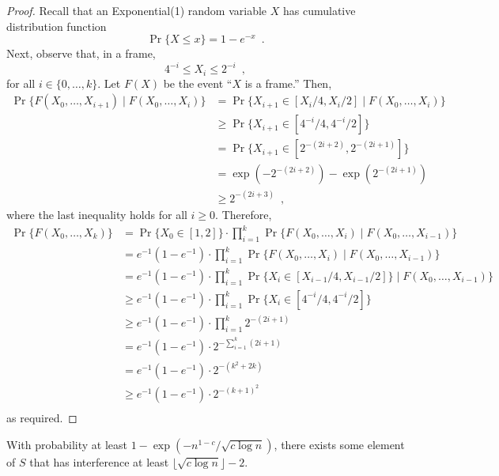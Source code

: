 \documentclass{patmorin}
\begin{document}
\begin{proof}
Recall that an Exponential(1) random variable $X$ has cumulative
distribution function
\[
   \Pr\{X \le x\} = 1-e^{-x} \enspace .
\]
Next, observe that, in a frame,
\[
                 4^{-i} \le X_i \le 2^{-i}  \enspace ,
\]
for all $i\in\{0,\ldots,k\}$.  Let $F(X)$ be the event ``$X$ is a frame.''
Then,
\begin{align*}
     \Pr\{F(X_0,\ldots,X_{i+1}) \mid F(X_0,\ldots,X_{i})\} 
        & = \Pr\{X_{i+1} \in [X_{i}/4,X_{i}/2] \mid F(X_0,\ldots,X_{i})\} \\
        & \ge \Pr\{X_{i+1} \in [4^{-i}/4,4^{-i}/2]\} \\
        & = \Pr\{X_{i+1} \in [2^{-(2i+2)},2^{-(2i+1)}]\} \\
        & = \exp(-2^{-(2i+2)}) - \exp(2^{-(2i+1)}) \\
        & \ge 2^{-(2i+3)} \enspace ,
\end{align*}
where the last inequality holds for all $i\ge 0$.  Therefore,
\begin{align*}
     \Pr\{F(X_0,\ldots,X_{k})\}
   & = \Pr\{X_0\in[1,2]\}
         \cdot\prod_{i=1}^k \Pr\{F(X_0,\ldots,X_{i})
                                 \mid F(X_0,\ldots,X_{i-1})\} \\
   & = e^{-1}(1-e^{-1})
         \cdot\prod_{i=1}^k \Pr\{F(X_0,\ldots,X_{i})
                                 \mid F(X_0,\ldots,X_{i-1})\} \\
   & = e^{-1}(1-e^{-1})
         \cdot\prod_{i=1}^k \Pr\{X_{i} \in [X_{i-1}/4,X_{i-1}/2]\}
                                 \mid F(X_0,\ldots,X_{i-1})\} \\
   & \ge e^{-1}(1-e^{-1})
         \cdot\prod_{i=1}^k \Pr\{X_{i} \in [4^{-i}/4,4^{-i}/2]\} \\
   & \ge e^{-1}(1-e^{-1})\cdot\prod_{i=1}^k 2^{-(2i+1)} \\
   & = e^{-1}(1-e^{-1})\cdot2^{-\sum_{i=1}^k(2i+1)} \\
   & = e^{-1}(1-e^{-1})\cdot2^{-(k^2+2k)} \\
   & \ge e^{-1}(1-e^{-1})\cdot2^{-(k+1)^2} \\
\end{align*}
as required.
\end{proof}


\begin{lem}
With probability at least $1-\exp(-n^{1-c}/\sqrt{c\log n})$, there exists
some element of $S$ that has interference at least $\lfloor\sqrt{c\log
n}\rfloor-2$.
\end{lem}
\end{document}
